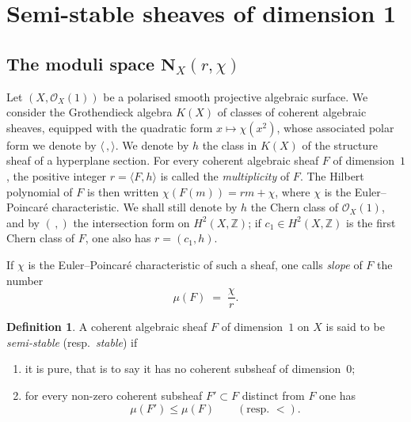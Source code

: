 \documentclass[12pt,english]{smfart}%
\theoremstyle{plain}
\theoremstyle{definition}
\newtheorem{definition}[theorem]{Definition}
\theoremstyle{remark}
\newcommand{\NN}{\mathbf{N}}           %
\newcommand{\ZZ}{\mathbb{Z}}
\newcommand{\Oh}{\mathcal{O}}
\newcommand{\origpage}[1]{\marginnote{\scriptsize\itshape p.~#1}}
\begin{document}
\section{Semi-stable sheaves of dimension 1}\label{sec:semistable}

\subsection{The moduli space \texorpdfstring{$\NN_{X}(r,\chi)$}{N\_X(r,chi)}}\label{subsec:moduli}

Let $(X,\Oh_{X}(1))$ be a polarised smooth projective algebraic surface. We consider the Grothendieck algebra $K(X)$ of classes of coherent algebraic sheaves, equipped with the quadratic form $x\mapsto\chi(x^{2})$, whose associated polar form we denote by $\langle\,,\rangle$. We denote by $h$ the class in $K(X)$ of the structure sheaf of a hyperplane section. For every coherent algebraic sheaf $F$ of dimension~$1$, the positive integer $r=\langle F,h\rangle$ is called the \emph{multiplicity} of $F$. The Hilbert polynomial of $F$ is then written $\chi(F(m))=rm+\chi$, where $\chi$ is the Euler--Poincar\'e characteristic. We shall still denote by $h$ the Chern class of $\Oh_{X}(1)$, and by $(\,,)$ the intersection form on $H^{2}(X,\ZZ)$; if $c_{1}\in H^{2}(X,\ZZ)$ is the first Chern class of $F$, one also has $r=(c_{1},h)$.

If $\chi$ is the Euler--Poincar\'e characteristic of such a sheaf, one calls \emph{slope} of $F$ the number
\[
\mu(F) \;=\; \frac{\chi}{r}.
\]
\origpage{638}

\begin{definition}\label{def:semistable}
A coherent algebraic sheaf $F$ of dimension~$1$ on $X$ is said to be \emph{semi-stable} (resp.\ \emph{stable}) if
\begin{enumerate}
\item it is pure, that is to say it has no coherent subsheaf of dimension~$0$;
\item for every non-zero coherent subsheaf $F'\subset F$ distinct from $F$ one has
\[
\mu(F') \leq \mu(F) \qquad (\text{resp. } <).
\]
\end{enumerate}
\end{definition}
\end{document}
